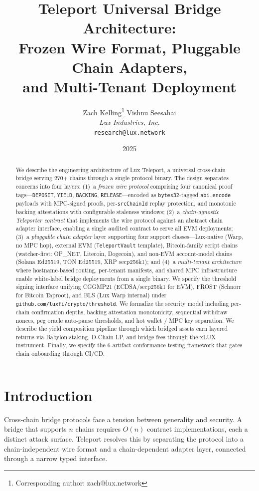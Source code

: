\documentclass[11pt]{article}
\title{Teleport Universal Bridge Architecture:\\Frozen Wire Format, Pluggable Chain Adapters,\\and Multi-Tenant Deployment}
\author{
Zach Kelling\thanks{Corresponding author: zach@lux.network}
\quad
Vishnu Seesahai\\
\textit{Lux Industries, Inc.}\\
\texttt{research@lux.network}
}
\date{2025}
\begin{document}
\luxcoverpage

\begin{abstract}
We describe the engineering architecture of Lux Teleport, a universal cross-chain bridge serving 270+ chains through a single protocol binary. The design separates concerns into four layers: (1)~a \emph{frozen wire protocol} comprising four canonical proof tags---\texttt{DEPOSIT}, \texttt{YIELD}, \texttt{BACKING}, \texttt{RELEASE}---encoded as \texttt{bytes32}-tagged \texttt{abi.encode} payloads with MPC-signed proofs, per-\texttt{srcChainId} replay protection, and monotonic backing attestations with configurable staleness windows; (2)~a \emph{chain-agnostic Teleporter contract} that implements the wire protocol against an abstract chain adapter interface, enabling a single audited contract to serve all EVM deployments; (3)~a \emph{pluggable chain adapter} layer supporting four support classes---Lux-native (Warp, no MPC hop), external EVM (\texttt{TeleportVault} template), Bitcoin-family script chains (watcher-first: OP\_NET, Litecoin, Dogecoin), and non-EVM account-model chains (Solana Ed25519, TON Ed25519, XRP secp256k1); and (4)~a \emph{multi-tenant architecture} where hostname-based routing, per-tenant manifests, and shared MPC infrastructure enable white-label bridge deployments from a single binary. We specify the threshold signing interface unifying CGGMP21 (ECDSA/secp256k1 for EVM), FROST (Schnorr for Bitcoin Taproot), and BLS (Lux Warp internal) under \texttt{github.com/luxfi/crypto/threshold}. We formalize the security model including per-chain confirmation depths, backing attestation monotonicity, sequential withdraw nonces, peg oracle auto-pause thresholds, and hot wallet / MPC key separation. We describe the yield composition pipeline through which bridged assets earn layered returns via Babylon staking, D-Chain LP, and bridge fees through the xLUX instrument. Finally, we specify the 6-artifact conformance testing framework that gates chain onboarding through CI/CD.
\end{abstract}

\tableofcontents

\section{Introduction}
\label{sec:intro}

Cross-chain bridge protocols face a tension between generality and security. A bridge that supports $n$ chains requires $O(n)$ contract implementations, each a distinct attack surface. Teleport resolves this by separating the protocol into a chain-independent wire format and a chain-dependent adapter layer, connected through a narrow typed interface.
\end{document}
